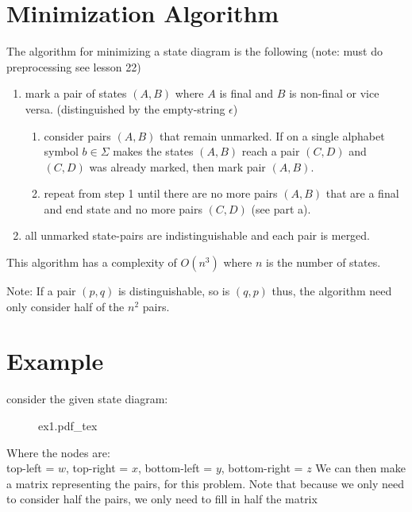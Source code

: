 \documentclass[12pt]{book}
\title{\coursetitle\linebreak\lecturename}
\author{\\Cain Susko\\ 
           \\ \\ \\
      Queen's University 
    \\School of Computing\\}
\newcommand{\incfig}[1]{%
    {#1.pdf_tex}
}
\begin{document}
\begin{titlepage}
        \maketitle
\end{titlepage}


\section*{Minimization Algorithm}
The algorithm for minimizing a state diagram is the following (note: must do preprocessing see lesson 22)
\begin{enumerate}
        \item mark a pair of states $(A,B)$ where  $A$ is final and  $B$ is non-final or vice versa. 
                (distinguished by the empty-string $\epsilon$)
        \begin{enumerate}         
                \item consider pairs $(A,B)$ that remain unmarked. 
                        If on a single alphabet symbol  $b\in\Sigma$ makes the states  $(A,B)$ reach a pair  $(C,D)$ and $(C,D)$
                        was already marked, then mark pair $(A,B)$.
                \item repeat from step 1 until there are no more pairs $(A,B)$ that are a final and end state and no more 
                        pairs $(C,D)$ (see part a).
        \end{enumerate}

        \item all unmarked state-pairs are indistinguishable and each pair is merged.
\end{enumerate}

This algorithm has a complexity of $O(n^3)$ where  $n$ is the number of states.

Note: If a pair  $(p,q)$ is distinguishable, so is  $(q,p)$ thus, the algorithm need only consider half of the $n^2$ pairs.

\section*{Example}
consider the given state diagram:
\begin{figure}[h]
        \centering
        \incfig{ex1}
\end{figure}

Where the nodes are:\\ top-left = $w$, top-right = $x$, bottom-left = $y$, bottom-right = $z$
We can then make a matrix representing the pairs, for this problem. 
Note that because we only need to consider half the pairs, we only need to fill in half the matrix\\
\end{document}
